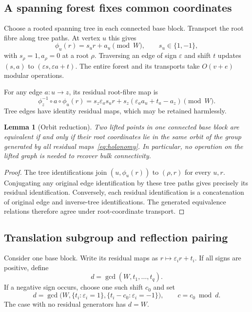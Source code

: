 \documentclass[11pt]{article}
\newtheorem{lemma}[theorem]{Lemma}
\theoremstyle{definition}
\newcommand{\eps}{\varepsilon}
\begin{document}
\subsection{A spanning forest fixes common coordinates}
Choose a rooted spanning tree in each connected base block. Transport the root fibre along tree paths. At vertex $u$ this gives
\begin{equation}
 \phi_u(r)=s_u r+a_u\pmod W,
 \qquad s_u\in\{1,-1\},
 \label{eq:gauge}
\end{equation}
with $s_\rho=1,a_\rho=0$ at a root $\rho$. Traversing an edge of sign $\eps$ and shift $t$ updates $(s,a)$ to $(\eps s,\eps a+t)$. The entire forest and its transports take $O(v+e)$ modular operations.

For any edge $a:u\to z$, its residual root-fibre map is
\begin{equation}
 \phi_z^{-1}\circ a\circ\phi_u(r)
 =s_z\eps_a s_u r+s_z(\eps_a a_u+t_a-a_z)\pmod W.
 \label{eq:holonomy}
\end{equation}
Tree edges have identity residual maps, which may be retained harmlessly.

\begin{lemma}[Orbit reduction]
Two lifted points in one connected base block are equivalent if and only if their root coordinates lie in the same orbit of the group generated by all residual maps~\eqref{eq:holonomy}. In particular, no operation on the lifted graph is needed to recover bulk connectivity.
\end{lemma}
\begin{proof}
The tree identifications join $(u,\phi_u(r))$ to $(\rho,r)$ for every $u,r$. Conjugating any original edge identification by these tree paths gives precisely its residual identification. Conversely, each residual identification is a concatenation of original edge and inverse-tree identifications. The generated equivalence relations therefore agree under root-coordinate transport.
\end{proof}

\subsection{Translation subgroup and reflection pairing}
Consider one base block. Write its residual maps as $r\mapsto\eps_i r+t_i$. If all signs are positive, define
\begin{equation}
 d=\gcd(W,t_1,\ldots,t_q).
 \label{eq:gcdpositive}
\end{equation}
If a negative sign occurs, choose one such shift $c_0$ and set
\begin{equation}
 d=\gcd\bigl(W,\{t_i:\eps_i=1\},\{t_i-c_0:\eps_i=-1\}\bigr),
 \qquad c=c_0\bmod d.
 \label{eq:gcdsigned}
\end{equation}
The case with no residual generators has $d=W$.
\end{document}
